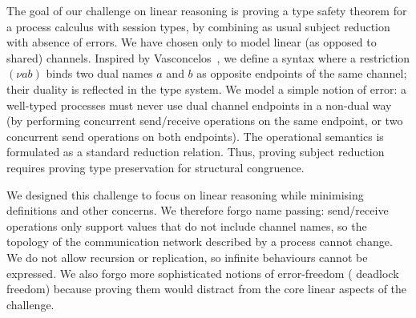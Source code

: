 \documentclass[runningheads]{llncs}
\begin{document}
The goal of our challenge on linear reasoning is proving a type safety theorem
for a process calculus with session types, by combining as usual subject
reduction with absence of errors.  We have chosen  only to model linear (as
opposed to shared) channels. Inspired by Vasconcelos~\cite{Vasconcelos2012}, we
define a syntax where a restriction $(\nu ab)$ binds two dual names $a$
and $b$ as opposite endpoints of the same channel; their duality is
reflected in the type system. We model a simple notion of error: a well-typed
processes must never use dual channel endpoints in a non-dual way (\eg by
performing concurrent send/receive operations on the same endpoint, or two
concurrent send operations on both endpoints).
The operational semantics is formulated as a standard reduction relation. Thus,
proving subject reduction requires proving type preservation for structural
congruence.

We designed this challenge to focus on linear reasoning while minimising
definitions and other concerns.  We therefore forgo name passing:
send/receive operations only support values that do not include channel names, so
the topology of the communication network described by a process cannot change.
We do not allow recursion or replication, so infinite behaviours cannot be
expressed. We also forgo more sophisticated notions of error-freedom (\eg
deadlock freedom) because proving them would distract from the core linear
aspects of the challenge.
\end{document}

